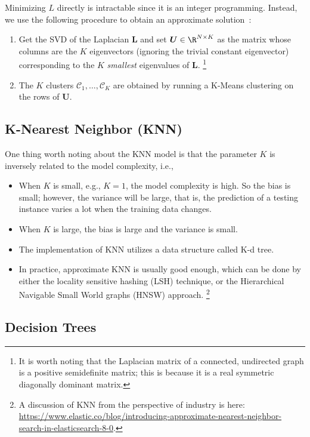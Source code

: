         Minimizing $L$ directly is intractable since it is an integer programming.
        Instead, we use the following procedure to obtain an approximate solution~\cite{shalev2014understanding}:
            \begin{enumerate}
                \item Get the SVD of the Laplacian $\bm{L}$ and set $\bm{U} \in \R^{\ndata \times K}$ as the matrix whose columns are the $K$ eigenvectors (ignoring the trivial constant eigenvector) corresponding to the $K$ \emph{smallest} eigenvalues of $\bm{L}$.
                \footnote{It is worth noting that the Laplacian matrix of a connected, undirected graph is a positive semidefinite matrix; this is because it is a real symmetric diagonally dominant matrix.}
                \item The $K$ clusters $\mathcal{C}_1,\ldots, \mathcal{C}_K$ are obtained by running a K-Means clustering on the rows of $\bm{U}$.
            \end{enumerate}
        
        
\subsection{K-Nearest Neighbor (KNN)}
One thing worth noting about the KNN model is that the parameter $K$ is inversely related to the model complexity, i.e., 
    \begin{itemize}
        \item When $K$ is small, e.g., $K=1$, the model complexity is high. So the bias is small; however, the variance will be large, that is, the prediction of a testing instance varies a lot when the training data changes. 
        \item When $K$ is large, the bias is large and the variance is small.
        \item The implementation of KNN utilizes a data structure called K-d tree. 
        \item In practice, approximate KNN is usually good enough, which can be done by either the locality sensitive hashing (LSH) technique, or the  Hierarchical Navigable Small World graphs (HNSW) approach.
        \footnote{A discussion of KNN from the perspective of industry is here: \url{https://www.elastic.co/blog/introducing-approximate-nearest-neighbor-search-in-elasticsearch-8-0}.}
    \end{itemize}


\subsection{Decision Trees}
